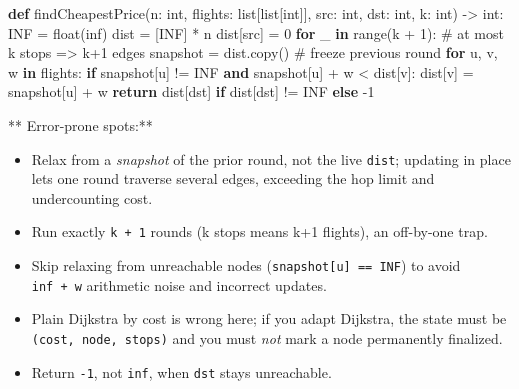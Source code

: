 \documentclass[11pt]{article}
\providecommand{\tightlist}{\setlength{\itemsep}{1pt}\setlength{\parskip}{0pt}}
\newenvironment{Shaded}{\begin{snugshade}}{\end{snugshade}}
\newcommand{\BuiltInTok}[1]{\textcolor[rgb]{0.50,0.55,0.55}{#1}}
\newcommand{\CommentTok}[1]{\textcolor[rgb]{0.48,0.49,0.49}{#1}}
\newcommand{\ControlFlowTok}[1]{\textcolor[rgb]{0.99,0.74,0.29}{\textbf{#1}}}
\newcommand{\DecValTok}[1]{\textcolor[rgb]{0.96,0.45,0.00}{#1}}
\newcommand{\KeywordTok}[1]{\textcolor[rgb]{0.81,0.81,0.76}{\textbf{#1}}}
\newcommand{\NormalTok}[1]{\textcolor[rgb]{0.81,0.81,0.76}{#1}}
\newcommand{\OperatorTok}[1]{\textcolor[rgb]{0.81,0.81,0.76}{#1}}
\newcommand{\StringTok}[1]{\textcolor[rgb]{0.96,0.31,0.31}{#1}}
\begin{document}
\begin{Shaded}
\begin{Highlighting}[]
\KeywordTok{def}\NormalTok{ findCheapestPrice(n: }\BuiltInTok{int}\NormalTok{, flights: }\BuiltInTok{list}\NormalTok{[}\BuiltInTok{list}\NormalTok{[}\BuiltInTok{int}\NormalTok{]], src: }\BuiltInTok{int}\NormalTok{, dst: }\BuiltInTok{int}\NormalTok{, k: }\BuiltInTok{int}\NormalTok{) }\OperatorTok{{-}\textgreater{}} \BuiltInTok{int}\NormalTok{:}
\NormalTok{    INF }\OperatorTok{=} \BuiltInTok{float}\NormalTok{(}\StringTok{\textquotesingle{}inf\textquotesingle{}}\NormalTok{)}
\NormalTok{    dist }\OperatorTok{=}\NormalTok{ [INF] }\OperatorTok{*}\NormalTok{ n}
\NormalTok{    dist[src] }\OperatorTok{=} \DecValTok{0}
    \ControlFlowTok{for}\NormalTok{ \_ }\KeywordTok{in} \BuiltInTok{range}\NormalTok{(k }\OperatorTok{+} \DecValTok{1}\NormalTok{):                 }\CommentTok{\# at most k stops =\textgreater{} k+1 edges}
\NormalTok{        snapshot }\OperatorTok{=}\NormalTok{ dist.copy()             }\CommentTok{\# freeze previous round}
        \ControlFlowTok{for}\NormalTok{ u, v, w }\KeywordTok{in}\NormalTok{ flights:}
            \ControlFlowTok{if}\NormalTok{ snapshot[u] }\OperatorTok{!=}\NormalTok{ INF }\KeywordTok{and}\NormalTok{ snapshot[u] }\OperatorTok{+}\NormalTok{ w }\OperatorTok{\textless{}}\NormalTok{ dist[v]:}
\NormalTok{                dist[v] }\OperatorTok{=}\NormalTok{ snapshot[u] }\OperatorTok{+}\NormalTok{ w}
    \ControlFlowTok{return}\NormalTok{ dist[dst] }\ControlFlowTok{if}\NormalTok{ dist[dst] }\OperatorTok{!=}\NormalTok{ INF }\ControlFlowTok{else} \OperatorTok{{-}}\DecValTok{1}
\end{Highlighting}
\end{Shaded}

** Error-prone spots:**

\begin{itemize}
\tightlist
\item
  Relax from a \emph{snapshot} of the prior round, not the live \texttt{dist}; updating in place lets one round traverse several edges, exceeding the hop limit and undercounting cost.
\item
  Run exactly \texttt{k\ +\ 1} rounds (k stops means k+1 flights), an off-by-one trap.
\item
  Skip relaxing from unreachable nodes (\texttt{snapshot{[}u{]}\ ==\ INF}) to avoid \texttt{inf\ +\ w} arithmetic noise and incorrect updates.
\item
  Plain Dijkstra by cost is wrong here; if you adapt Dijkstra, the state must be \texttt{(cost,\ node,\ stops)} and you must \emph{not} mark a node permanently finalized.
\item
  Return \texttt{-1}, not \texttt{inf}, when \texttt{dst} stays unreachable.
\end{itemize}
\end{document}
